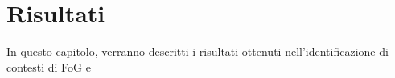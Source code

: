 
\chapter[Risultati]{Risultati}\label{chap6:result}
In questo capitolo, verranno descritti i risultati ottenuti nell'identificazione di contesti di FoG e 
